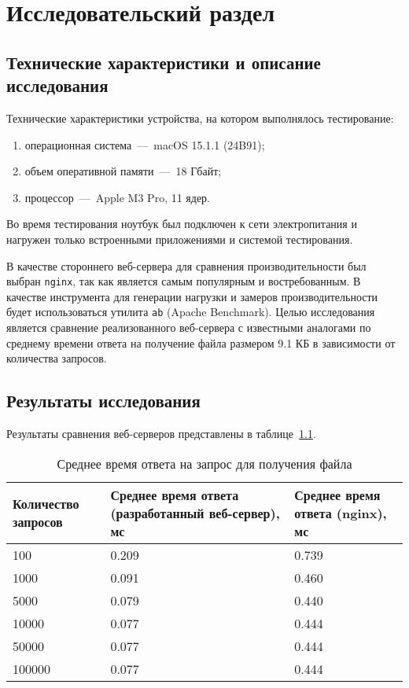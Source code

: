 \chapter{Исследовательский раздел}

\section{Технические характеристики и описание исследования}

Технические характеристики устройства, на котором выполнялось тестирование:
\begin{enumerate}
	\item операционная система~---~macOS 15.1.1 (24B91); 
	\item объем оперативной памяти~---~18 Гбайт;
	\item процессор~---~Apple M3 Pro, 11 ядер.
\end{enumerate}

Во время тестирования ноутбук был подключен к сети электропитания и нагружен только встроенными приложениями и системой тестирования.

В качестве стороннего веб-сервера для сравнения производительности был выбран \texttt{nginx}, так как является самым популярным и востребованным.
В качестве инструмента для генерации нагрузки и замеров производительности будет использоваться утилита \texttt{ab} (Apache Benchmark).
Целью исследования является сравнение реализованного веб-сервера с известными аналогами по среднему времени ответа на получение файла размером 9.1 КБ в зависимости от количества запросов.

\clearpage
\section{Результаты исследования}

Результаты сравнения веб-серверов представлены в таблице~\ref{table1}.
\begin{table}[!ht]
	\centering
	\caption{Среднее время ответа на запрос для получения файла}
	\label{table1}
	\begin{tabularx}{\textwidth}{|X|X|X|}
		\hline
		Количество запросов & Среднее время ответа (разработанный веб-сервер), мс & Среднее время ответа (nginx), мс \\ \hline
		100 & 0.209 & 0.739 \\ \hline
		1000 & 0.091 & 0.460 \\ \hline
		5000 & 0.079 & 0.440 \\ \hline
		10000 & 0.077 & 0.444 \\ \hline
		50000 & 0.077 & 0.444 \\ \hline
		100000 & 0.077 & 0.444 \\ \hline
	\end{tabularx}
\end{table}

